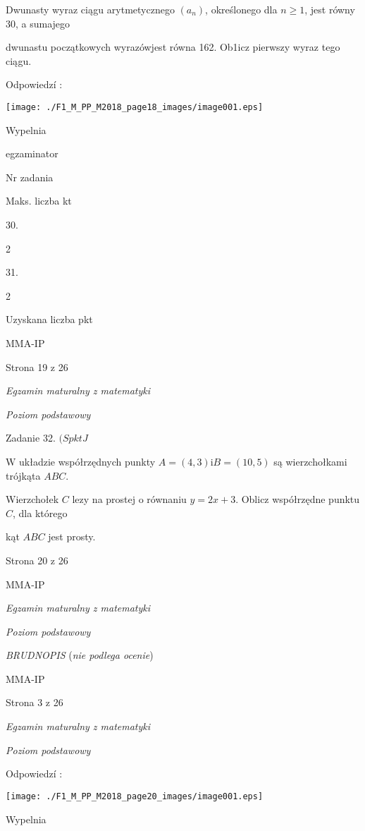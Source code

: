 \documentclass[a4paper,12pt]{article}
\begin{document}
Dwunasty wyraz ciągu arytmetycznego $(a_{n})$, określonego dla $n\geq 1$, jest równy 30, a sumajego

dwunastu początkowych wyrazówjest równa 162. Ob1icz pierwszy wyraz tego ciągu.

Odpowiedzí :
\begin{center}
\texttt{[image: ./F1\_M\_PP\_M2018\_page18\_images/image001.eps]}
\end{center}
Wypelnia

egzaminator

Nr zadania

Maks. liczba kt

30.

2

31.

2

Uzyskana liczba pkt

MMA-IP

Strona 19 z 26





{\it Egzamin maturalny z matematyki}

{\it Poziom podstawowy}

Zadanie 32. $(SpktJ$

$\mathrm{W}$ układzie współrzędnych punkty $A=(4,3) \mathrm{i} B=(10,5)$ są wierzchołkami trójkąta $ABC.$

Wierzchołek $C$ lezy na prostej o równaniu $y=2x+3$. Oblicz współrzędne punktu $C$, dla którego

kąt $ABC$ jest prosty.

Strona 20 z 26

MMA-IP





{\it Egzamin maturalny z matematyki}

{\it Poziom podstawowy}

{\it BRUDNOPIS} ({\it nie podlega ocenie})

MMA-IP

Strona 3 z 26





{\it Egzamin maturalny z matematyki}

{\it Poziom podstawowy}

Odpowiedzí :
\begin{center}
\texttt{[image: ./F1\_M\_PP\_M2018\_page20\_images/image001.eps]}
\end{center}
Wypelnia
\end{document}
